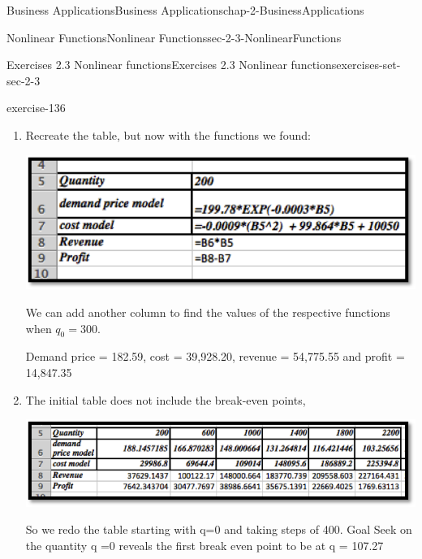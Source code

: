 \documentclass[oneside,10pt,]{book}
\numberwithin{equation}{section}
\begin{document}
\begin{chapterptx}{Business Applications}{}{Business Applications}{}{}{chap-2-BusinessApplications}
\begin{sectionptx}{Nonlinear Functions}{}{Nonlinear Functions}{}{}{sec-2-3-NonlinearFunctions}
\begin{exercises-subsection-numberless}{Exercises 2.3 Nonlinear functions}{}{Exercises 2.3 Nonlinear functions}{}{}{exercises-set-sec-2-3}
\begin{exercisegroup}
\begin{divisionexerciseeg}{21}{}{}{exercise-136}
\begin{enumerate}[label=(\alph*)]
\begin{equation*}
Revenue=x*199.78e^{(-0.0003x)}
\end{equation*}
%
\begin{equation*}
Profit=x*199.78e^{(-0.0003x)}-(-0.0009x^2  + 99.864x + 10050)
\end{equation*}
%
\item\hypertarget{li-269}{}\hypertarget{p-884}{}%
Recreate the table, but now with the functions we found: \leavevmode%
\begin{sidebyside}{1}{0}{0}{0}%
\begin{sbspanel}{1}%
\includegraphics[width=1\linewidth]{images/sec2-3-sol21a.png}
\end{sbspanel}%
\end{sidebyside}%
 We can add another column to find the values of the respective functions when \(q_0=300\).%
\par
\hypertarget{p-885}{}%
Demand price = \textdollar{} 182.59, cost = \textdollar{}39,928.20, revenue = \textdollar{}54,775.55 and profit = \textdollar{}14,847.35%
\item\hypertarget{li-270}{}\hypertarget{p-886}{}%
The initial table does not include the break-even points, \leavevmode%
\begin{sidebyside}{1}{0}{0}{0}%
\begin{sbspanel}{1}%
\includegraphics[width=1\linewidth]{images/sec2-3-sol21b.png}
\end{sbspanel}%
\end{sidebyside}%
 So we redo the table starting with q=0 and taking steps of 400. Goal Seek on the quantity q =0 reveals the first break even point to be at q = 107.27 \begin{sidebyside}{1}{0}{0}{0}%
\begin{sbspanel}{1}%

\end{sbspanel}
\end{sidebyside}
\end{enumerate}
\end{divisionexerciseeg}
\end{exercisegroup}
\end{exercises-subsection-numberless}
\end{sectionptx}
\end{chapterptx}
\end{document}
